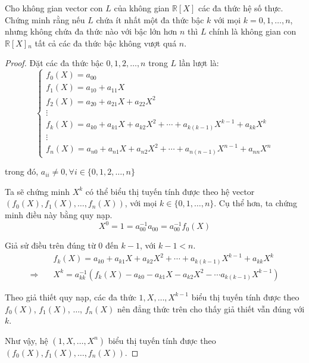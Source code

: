 \documentclass[class=linearalgebra,crop=false]{standalone}
\begin{document}
\begin{exercise}Cho không gian vector con $L$ của không gian $\mathbb{R}[X]$ các đa thức hệ số thực. Chứng minh rằng nếu $L$ chứa ít nhất một đa thức bậc $k$ với mọi $k = 0, 1,\ldots, n$, nhưng không chứa đa thức nào với bậc lớn hơn $n$ thì $L$ chính là không gian con $\mathbb{R}[X]{}_{n}$ tất cả các đa thức bậc không vượt quá $n$.
\end{exercise}

\begin{proof}Đặt các đa thức bậc $0, 1, 2,\ldots, n$ trong $L$ lần lượt là:
    \[
        \begin{cases}
            f_{0}(X) = a_{00} \\
            f_{1}(X) = a_{10} + a_{11}X \\
            f_{2}(X) = a_{20} + a_{21}X + a_{22}X^{2} \\
            \vdots \\
            f_{k}(X) = a_{k0} + a_{k1}X + a_{k2}X^{2} + \cdots + a_{k(k-1)}X^{k-1} + a_{kk}X^{k} \\
            \vdots \\
            f_{n}(X) = a_{n0} + a_{n1}X + a_{n2}X^{2} + \cdots + a_{n(n-1)}X^{n-1} + a_{nn}X^{n}
        \end{cases}
    \]
    \par trong đó, $a_{ii}\ne 0, \forall i\in\{0, 1, 2,\ldots, n\}$
    \par Ta sẽ chứng minh $X^{k}$ có thể biểu thị tuyến tính được theo hệ vector $(f_{0}(X), f_{1}(X), \ldots, f_{n}(X))$, với mọi $k\in\{0,1,\ldots, n\}$. Cụ thể hơn, ta chứng minh điều này bằng quy nạp.
    \[ X^{0} = 1 = a^{-1}_{00}a_{00} = a^{-1}_{00}f_{0}(X) \]
    \par Giả sử điều trên đúng từ $0$ đến $k-1$, với $k-1 < n$.
    \begin{align*}
        &f_{k}(X) = a_{k0} + a_{k1}X + a_{k2}X^{2} + \cdots + a_{k(k-1)}X^{k-1} + a_{kk}X^{k} \\
        \Rightarrow\quad&X^{k} = a^{-1}_{kk}(f_{k}(X) - a_{k0} - a_{k1}X - a_{k2}X^{2} - \cdots a_{k(k-1)}X^{k-1})
    \end{align*}
    \par Theo giả thiết quy nạp, các đa thức $1, X, \ldots, X^{k-1}$ biểu thị tuyến tính được theo $f_{0}(X)$, $f_{1}(X)$, $\ldots$, $f_{n}(X)$ nên đẳng thức trên cho thấy giả thiết vẫn đúng với $k$.
    \par Như vậy, hệ $(1, X, \ldots, X^{n})$ biểu thị tuyến tính được theo $(f_{0}(X), f_{1}(X), \ldots, f_{n}(X))$.

\end{proof}
\end{document}
